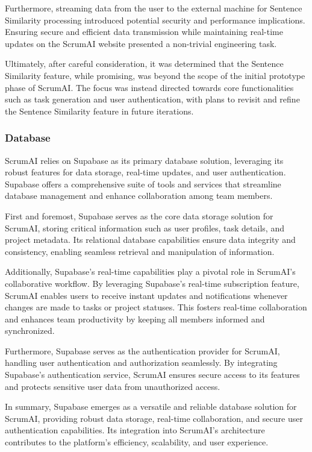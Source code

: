\documentclass[conference]{IEEEtran}
\begin{document}
Furthermore, streaming data from the user to the external machine for Sentence Similarity processing introduced potential security and performance implications. Ensuring secure and efficient data transmission while maintaining real-time updates on the ScrumAI website presented a non-trivial engineering task.

Ultimately, after careful consideration, it was determined that the Sentence Similarity feature, while promising, was beyond the scope of the initial prototype phase of ScrumAI. The focus was instead directed towards core functionalities such as task generation and user authentication, with plans to revisit and refine the Sentence Similarity feature in future iterations.

\subsubsection{Database}
ScrumAI relies on Supabase as its primary database solution, leveraging its robust features for data storage, real-time updates, and user authentication. Supabase offers a comprehensive suite of tools and services that streamline database management and enhance collaboration among team members.

First and foremost, Supabase serves as the core data storage solution for ScrumAI, storing critical information such as user profiles, task details, and project metadata. Its relational database capabilities ensure data integrity and consistency, enabling seamless retrieval and manipulation of information.

Additionally, Supabase's real-time capabilities play a pivotal role in ScrumAI's collaborative workflow. By leveraging Supabase's real-time subscription feature, ScrumAI enables users to receive instant updates and notifications whenever changes are made to tasks or project statuses. This fosters real-time collaboration and enhances team productivity by keeping all members informed and synchronized.

Furthermore, Supabase serves as the authentication provider for ScrumAI, handling user authentication and authorization seamlessly. By integrating Supabase's authentication service, ScrumAI ensures secure access to its features and protects sensitive user data from unauthorized access.

In summary, Supabase emerges as a versatile and reliable database solution for ScrumAI, providing robust data storage, real-time collaboration, and secure user authentication capabilities. Its integration into ScrumAI's architecture contributes to the platform's efficiency, scalability, and user experience.
\end{document}
